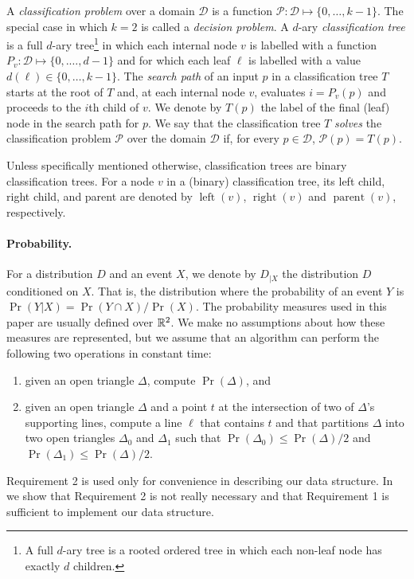 \documentclass[charterfonts,lotsofwhite]{patmorin}
\DeclareMathOperator{\lft}{left}
\DeclareMathOperator{\rght}{right}
\DeclareMathOperator{\prnt}{parent}
\begin{document}
A \emph{classification problem} over a domain $\mathcal{D}$ is a
function $\mathcal{P}:\mathcal{D}\mapsto \{0,\ldots,k-1\}$.  The
special case in which $k=2$ is called a \emph{decision problem}.  A
$d$-ary \emph{classification tree} is a full $d$-ary tree\footnote{A
full $d$-ary tree is a rooted ordered tree in which each non-leaf node
has exactly $d$ children.} in which each internal node $v$ is labelled
with a function $P_v:\mathcal{D}\mapsto\{0,.\ldots,d-1\}$ and for
which each leaf $\ell$ is labelled with a value
$d(\ell)\in\{0,\ldots,k-1\}$. The \emph{search path} of an input $p$
in a classification tree $T$ starts at the root of $T$ and, at each
internal node $v$, evaluates $i=P_v(p)$ and proceeds to the $i$th
child of $v$.  We denote by $T(p)$ the label of the final (leaf) node
in the search path for $p$.  We say that the classification tree $T$
\emph{solves} the classification problem $\mathcal{P}$ over the domain
$\mathcal{D}$ if, for every $p\in \mathcal{D}$, $\mathcal{P}(p)=T(p)$.

Unless specifically mentioned otherwise, classification trees are
binary classification trees.  For a node $v$ in a (binary)
classification tree, its left child, right child, and parent are
denoted by $\lft(v)$, $\rght(v)$ and $\prnt(v)$, respectively.


\paragraph{Probability.}

For a distribution $D$ and an event $X$, we denote by $D_{|X}$ the
distribution $D$ conditioned on $X$.  That is, the distribution where
the probability of an event $Y$ is $\Pr(Y|X)=\Pr(Y\cap X)/\Pr(X)$.
The probability measures used in this paper are usually defined over
$\mathbb{R}^2$.  We make no assumptions about how these measures are
represented, but we assume that an algorithm can perform the following
two operations in constant time:
\begin{enumerate}
\item given an open triangle $\Delta$, compute $\Pr(\Delta)$, and
\item given an open triangle $\Delta$ and a point $t$ at the
intersection of two of $\Delta$'s supporting lines, compute a line $\ell$
that contains $t$ and that partitions $\Delta$ into two open triangles
$\Delta_0$ and $\Delta_1$ such that $\Pr(\Delta_0)\le\Pr(\Delta)/2$
and $\Pr(\Delta_1)\le\Pr(\Delta)/2$.
\end{enumerate}
Requirement 2 is used only for convenience in describing our data
structure.  In  we show that 
Requirement 2 is not really necessary and that Requirement 1 is sufficient to
implement our data structure.
\end{document}
